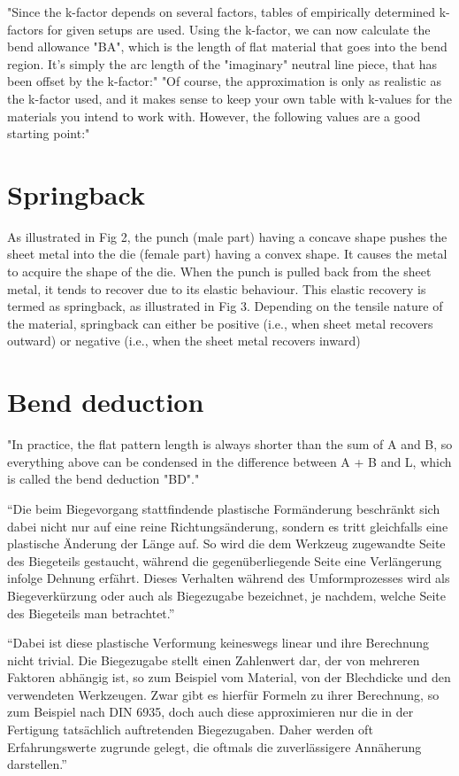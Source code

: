 "Since the k-factor depends on several factors, tables of empirically determined k-factors for given setups are used. Using the k-factor, we can now calculate the bend allowance "BA", which is the length of flat material that goes into the bend region. It’s simply the arc length of the "imaginary" neutral line piece, that has been offset by the k-factor:"
"Of course, the approximation is only as realistic as the k-factor used, and it makes sense to keep your own table with k-values for the materials you intend to work with. However, the following values are a good starting point:"

\section{Springback} 
As illustrated in Fig 2, the punch (male part) having a concave shape pushes the sheet metal into the die 
(female part) having a convex shape. It causes the metal to acquire the shape of the die. When the punch 
is pulled back from the sheet metal, it tends to recover due to its elastic behaviour. This elastic recovery 
is termed as springback, as illustrated in Fig 3. Depending on the tensile nature of the material, 
springback can either be positive (i.e., when sheet metal recovers outward) or negative (i.e., when the 
sheet metal recovers inward) 
\cite{baig_machinelearningprediction_2021}

\section{Bend deduction}
"In practice, the flat pattern length is always shorter than the sum of A and B, so everything above can be condensed in the difference between A + B and L, which is called the bend deduction "BD"." 
\cite{by_artsciencebending_2016a}

“Die beim Biegevorgang stattfindende plastische Formänderung beschränkt sich dabei nicht nur auf eine reine Richtungsänderung, sondern es tritt gleichfalls eine plastische Änderung der Länge auf. So wird die dem Werkzeug zugewandte Seite des Biegeteils gestaucht, während die gegenüberliegende Seite eine Verlängerung infolge Dehnung erfährt. Dieses Verhalten während des Umformprozesses wird als Biegeverkürzung oder auch als Biegezugabe bezeichnet, je nachdem, welche Seite des Biegeteils man betrachtet.” 
\cite{rockhausen_integrationsolidworksprozesskette_2010} 

“Dabei ist diese plastische Verformung keineswegs linear und ihre Berechnung nicht trivial. Die Biegezugabe stellt einen Zahlenwert dar, der von mehreren Faktoren abhängig ist, so zum Beispiel vom Material, von der Blechdicke und den verwendeten Werkzeugen. Zwar gibt es hierfür Formeln zu ihrer Berechnung, so zum Beispiel nach DIN 6935, doch auch diese approximieren nur die in der Fertigung tatsächlich auftretenden Biegezugaben. Daher werden oft Erfahrungswerte zugrunde gelegt, die oftmals die zuverlässigere Annäherung darstellen.” 
\cite{rockhausen_integrationsolidworksprozesskette_2010} 

